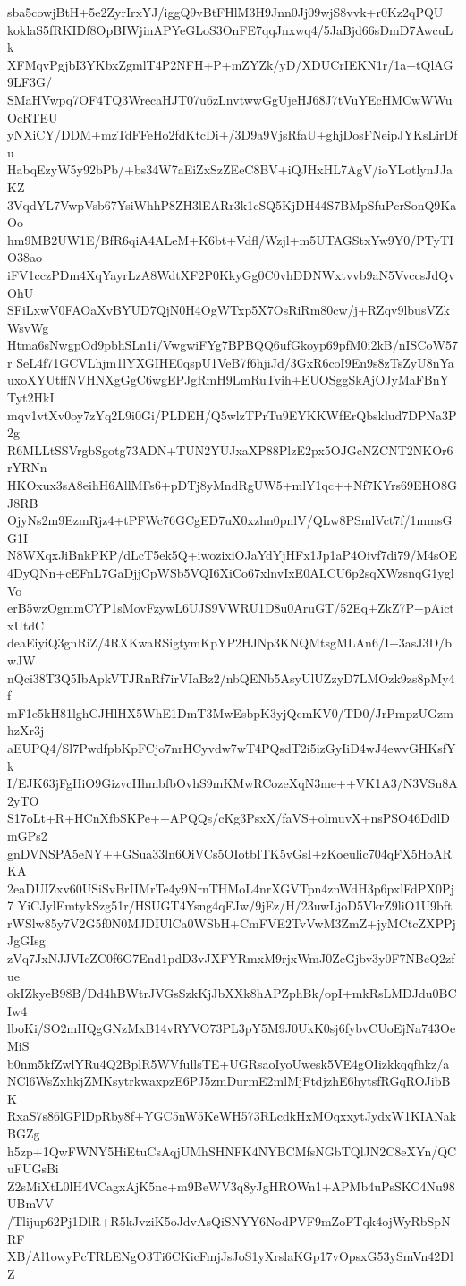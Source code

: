 sba5cowjBtH+5e2ZyrIrxYJ/iggQ9vBtFHlM3H9Jnn0Jj09wjS8vvk+r0Kz2qPQU
koklaS5fRKIDf8OpBIWjinAPYeGLoS3OnFE7qqJnxwq4/5JaBjd66sDmD7AwcuLk
XFMqvPgjbI3YKbxZgmlT4P2NFH+P+mZYZk/yD/XDUCrIEKN1r/1a+tQlAG9LF3G/
SMaHVwpq7OF4TQ3WrecaHJT07u6zLnvtwwGgUjeHJ68J7tVuYEcHMCwWWuOcRTEU
yNXiCY/DDM+mzTdFFeHo2fdKtcDi+/3D9a9VjsRfaU+ghjDosFNeipJYKsLirDfu
HabqEzyW5y92bPb/+bs34W7aEiZxSzZEeC8BV+iQJHxHL7AgV/ioYLotlynJJaKZ
3VqdYL7VwpVsb67YsiWhhP8ZH3lEARr3k1cSQ5KjDH44S7BMpSfuPcrSonQ9KaOo
hm9MB2UW1E/BfR6qiA4ALeM+K6bt+Vdfl/Wzjl+m5UTAGStxYw9Y0/PTyTIO38ao
iFV1cczPDm4XqYayrLzA8WdtXF2P0KkyGg0C0vhDDNWxtvvb9aN5VvccsJdQvOhU
SFiLxwV0FAOaXvBYUD7QjN0H4OgWTxp5X7OsRiRm80cw/j+RZqv9lbusVZkWsvWg
Htma6sNwgpOd9pbhSLn1i/VwgwiFYg7BPBQQ6ufGkoyp69pfM0i2kB/nISCoW57r
SeL4f71GCVLhjm1lYXGIHE0qspU1VeB7f6hjiJd/3GxR6coI9En9s8zTsZyU8nYa
uxoXYUtffNVHNXgGgC6wgEPJgRmH9LmRuTvih+EUOSggSkAjOJyMaFBnYTyt2HkI
mqv1vtXv0oy7zYq2L9i0Gi/PLDEH/Q5wlzTPrTu9EYKKWfErQbsklud7DPNa3P2g
R6MLLtSSVrgbSgotg73ADN+TUN2YUJxaXP88PlzE2px5OJGcNZCNT2NKOr6rYRNn
HKOxux3sA8eihH6AllMFs6+pDTj8yMndRgUW5+mlY1qc++Nf7KYrs69EHO8GJ8RB
OjyNs2m9EzmRjz4+tPFWc76GCgED7uX0xzhn0pnlV/QLw8PSmlVct7f/1mmsGG1I
N8WXqxJiBnkPKP/dLcT5ek5Q+iwozixiOJaYdYjHFx1Jp1aP4Oivf7di79/M4sOE
4DyQNn+cEFnL7GaDjjCpWSb5VQI6XiCo67xlnvIxE0ALCU6p2sqXWzsnqG1yglVo
erB5wzOgmmCYP1sMovFzywL6UJS9VWRU1D8u0AruGT/52Eq+ZkZ7P+pAictxUtdC
deaEiyiQ3gnRiZ/4RXKwaRSigtymKpYP2HJNp3KNQMtsgMLAn6/I+3asJ3D/bwJW
nQci38T3Q5IbApkVTJRnRf7irVIaBz2/nbQENb5AsyUlUZzyD7LMOzk9zs8pMy4f
mF1e5kH81lghCJHlHX5WhE1DmT3MwEsbpK3yjQcmKV0/TD0/JrPmpzUGzmhzXr3j
aEUPQ4/Sl7PwdfpbKpFCjo7nrHCyvdw7wT4PQsdT2i5izGyIiD4wJ4ewvGHKsfYk
I/EJK63jFgHiO9GizvcHhmbfbOvhS9mKMwRCozeXqN3me++VK1A3/N3VSn8A2yTO
S17oLt+R+HCnXfbSKPe++APQQs/cKg3PsxX/faVS+olmuvX+nsPSO46DdlDmGPs2
gnDVNSPA5eNY++GSua33ln6OiVCs5OIotbITK5vGsI+zKoeulic704qFX5HoARKA
2eaDUIZxv60USiSvBrIIMrTe4y9NrnTHMoL4nrXGVTpn4znWdH3p6pxlFdPX0Pj7
YiCJylEmtykSzg51r/HSUGT4Ysng4qFJw/9jEz/H/23uwLjoD5VkrZ9liO1U9bft
rWSlw85y7V2G5f0N0MJDIUlCa0WSbH+CmFVE2TvVwM3ZmZ+jyMCtcZXPPjJgGIsg
zVq7JxNJJVIcZC0f6G7End1pdD3vJXFYRmxM9rjxWmJ0ZcGjbv3y0F7NBcQ2zfue
okIZkyeB98B/Dd4hBWtrJVGsSzkKjJbXXk8hAPZphBk/opI+mkRsLMDJdu0BCIw4
lboKi/SO2mHQgGNzMxB14vRYVO73PL3pY5M9J0UkK0sj6fybvCUoEjNa743OeMiS
b0nm5kfZwlYRu4Q2BplR5WVfullsTE+UGRsaoIyoUwesk5VE4gOIizkkqqfhkz/a
NCl6WsZxhkjZMKsytrkwaxpzE6PJ5zmDurmE2mlMjFtdjzhE6hytsfRGqROJibBK
RxaS7s86lGPlDpRby8f+YGC5nW5KeWH573RLcdkHxMOqxxytJydxW1KIANakBGZg
h5zp+1QwFWNY5HiEtuCsAqjUMhSHNFK4NYBCMfsNGbTQlJN2C8eXYn/QCuFUGsBi
Z2sMiXtL0lH4VCagxAjK5nc+m9BeWV3q8yJgHROWn1+APMb4uPsSKC4Nu98UBmVV
/Tlijup62Pj1DlR+R5kJvziK5oJdvAsQiSNYY6NodPVF9mZoFTqk4ojWyRbSpNRF
XB/Al1owyPcTRLENgO3Ti6CKicFmjJsJoS1yXrslaKGp17vOpsxG53ySmVn42DlZ
